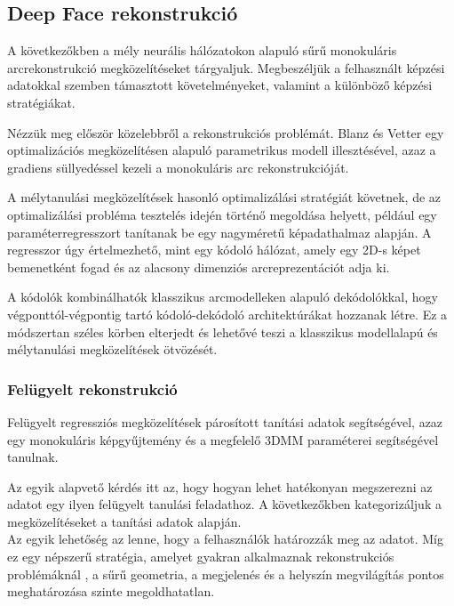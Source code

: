 \documentclass[12pt,a4]{article}
\begin{document}
	\subsection{Deep Face rekonstrukció}
	
	 A következőkben a mély neurális hálózatokon alapuló sűrű monokuláris arcrekonstrukció megközelítéseket tárgyaljuk. Megbeszéljük
	a felhasznált képzési adatokkal szemben támasztott követelményeket, valamint a különböző képzési
	stratégiákat. 
	
	
	Nézzük meg először közelebbről a rekonstrukciós problémát. Blanz és Vetter \cite{blanzvetter} egy optimalizációs megközelítésen alapuló parametrikus modell illesztésével, azaz a gradiens süllyedéssel kezeli a monokuláris arc rekonstrukcióját. 
	
	
	 A mélytanulási megközelítések hasonló optimalizálási stratégiát követnek, de az optimalizálási probléma 
	tesztelés idején történő megoldása helyett, például egy paraméterregresszort tanítanak be egy nagyméretű képadathalmaz alapján. A regresszor úgy értelmezhető, mint egy kódoló hálózat, amely egy 2D-s képet
	bemenetként fogad és az alacsony dimenziós arcreprezentációt adja ki. 
	
	
	A
	kódolók kombinálhatók klasszikus arcmodelleken alapuló dekódolókkal,
	hogy végponttól-végpontig tartó kódoló-dekódoló architektúrákat hozzanak létre.
	Ez a módszertan széles körben elterjedt és lehetővé teszi a klasszikus
	modellalapú és mélytanulási megközelítések ötvözését.
	
	\subsubsection{Felügyelt rekonstrukció}
	Felügyelt regressziós megközelítések
	párosított tanítási adatok segítségével, azaz egy monokuláris  képgyűjtemény
	és a megfelelő 3DMM paraméterei segítségével tanulnak.
	
	
	Az egyik alapvető kérdés itt az, hogy hogyan lehet hatékonyan megszerezni az adatot egy ilyen felügyelt tanulási feladathoz. A következőkben
	kategorizáljuk a megközelítéseket a
	tanítási adatok alapján. \\
	
	
	Az egyik lehetőség az lenne, hogy a felhasználók határozzák meg az adatot. Míg ez egy népszerű stratégia, amelyet gyakran alkalmaznak rekonstrukciós problémáknál \cite{saragih}, 
	a sűrű geometria, a megjelenés és a helyszín megvilágítás pontos meghatározása szinte megoldhatatlan.
	
\end{document}
